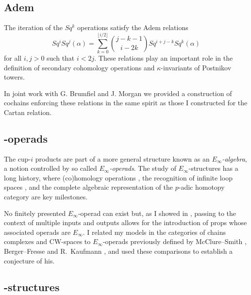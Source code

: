 \subsection{Adem} \label{ss:adem}

The iteration of the $Sq^k$ operations satisfy the Adem relations
\begin{equation*}
Sq^i Sq^j(\alpha) = \sum_{k=0}^{\lfloor i/2 \rfloor} \binom{j-k-1}{i-2k} Sq^{i+j-k} Sq^k(\alpha)
\end{equation*}
for all $i,j > 0$ such that $i < 2j$.
These relations play an important role in the definition of secondary cohomology operations and $\kappa$-invariants of Postnikov towers.

In joint work with G. Brumfiel and J. Morgan \cite{medina2021adem} we provided a construction of cochains enforcing these relations in the same spirit as those I constructed for the Cartan relation.

\subsection{\pdfEinfty-operads}

The cup-$i$ products are part of a more general structure known as an \textit{$E_\infty$-algebra}, a notion controlled by so called \textit{$E_\infty$-operads}.
The study of $E_\infty$-structures has a long history, where (co)homology operations \cite{steenrod1962cohomology, may1970general}, the recognition of infinite loop spaces \cite{boardman1973homotopy, may1972geometry}, and the complete algebraic representation of the $p$-adic homotopy category \cite{mandell2001padic} are key milestones.

No finitely presented $E_\infty$-operad can exist but, as I showed in \cite{medina2020prop1, medina2018prop2}, passing to the context of multiple inputs and outputs allows for the introduction of props whose associated operads are $E_\infty$.
I related my models in the categories of chains complexes and CW-spaces to $E_\infty$-operads previously defined by McClure--Smith \cite{mcclure2003multivariable}, Berger--Fresse \cite{berger2004combinatorial} and R.~Kaufmann \cite{kaufmann2009dimension}, and used these comparisons to establish a conjecture of his.

\subsection{\pdfEinfty-structures} \label{ss:e-infty structures}


